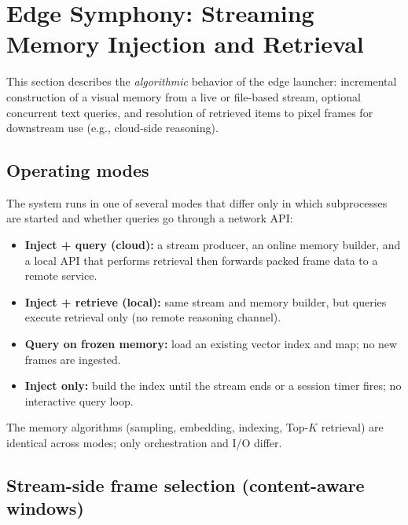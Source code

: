 
\section{Edge Symphony: Streaming Memory Injection and Retrieval}
\label{sec:edge-symphony}

This section describes the \emph{algorithmic} behavior of the edge launcher:
incremental construction of a visual memory from a live or file-based stream,
optional concurrent text queries, and resolution of retrieved items to pixel
frames for downstream use (e.g., cloud-side reasoning).

\subsection{Operating modes}
\label{sec:edge-modes}

The system runs in one of several modes that differ only in which subprocesses
are started and whether queries go through a network API:

\begin{itemize}
  \item \textbf{Inject + query (cloud):} a stream producer, an online memory
        builder, and a local API that performs retrieval then forwards packed
        frame data to a remote service.
  \item \textbf{Inject + retrieve (local):} same stream and memory builder, but
        queries execute retrieval only (no remote reasoning channel).
  \item \textbf{Query on frozen memory:} load an existing vector index and map;
        no new frames are ingested.
  \item \textbf{Inject only:} build the index until the stream ends or a
        session timer fires; no interactive query loop.
\end{itemize}

The memory algorithms (sampling, embedding, indexing, Top-$K$ retrieval) are
identical across modes; only orchestration and I/O differ.

\subsection{Stream-side frame selection (content-aware windows)}
\label{sec:stream-select}

